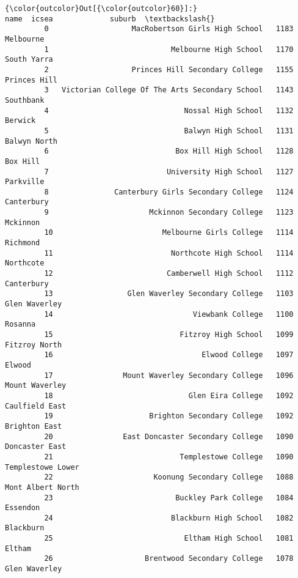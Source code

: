 \documentclass[11pt]{article}
\begin{document}
\begin{Verbatim}[commandchars=\\\{\}]
{\color{outcolor}Out[{\color{outcolor}60}]:}                                               name  icsea             suburb  \textbackslash{}
         0                   MacRobertson Girls High School   1183          Melbourne   
         1                            Melbourne High School   1170        South Yarra   
         2                   Princes Hill Secondary College   1155       Princes Hill   
         3   Victorian College Of The Arts Secondary School   1143          Southbank   
         4                               Nossal High School   1132            Berwick   
         5                               Balwyn High School   1131       Balwyn North   
         6                             Box Hill High School   1128           Box Hill   
         7                           University High School   1127          Parkville   
         8               Canterbury Girls Secondary College   1124         Canterbury   
         9                       Mckinnon Secondary College   1123           Mckinnon   
         10                         Melbourne Girls College   1114           Richmond   
         11                           Northcote High School   1114          Northcote   
         12                          Camberwell High School   1112         Canterbury   
         13                 Glen Waverley Secondary College   1103      Glen Waverley   
         14                                Viewbank College   1100            Rosanna   
         15                             Fitzroy High School   1099      Fitzroy North   
         16                                  Elwood College   1097             Elwood   
         17                Mount Waverley Secondary College   1096     Mount Waverley   
         18                               Glen Eira College   1092     Caulfield East   
         19                      Brighton Secondary College   1092      Brighton East   
         20                East Doncaster Secondary College   1090     Doncaster East   
         21                             Templestowe College   1090  Templestowe Lower   
         22                       Koonung Secondary College   1088  Mont Albert North   
         23                            Buckley Park College   1084           Essendon   
         24                           Blackburn High School   1082          Blackburn   
         25                              Eltham High School   1081             Eltham   
         26                     Brentwood Secondary College   1078      Glen Waverley   

\end{Verbatim}
\end{document}
